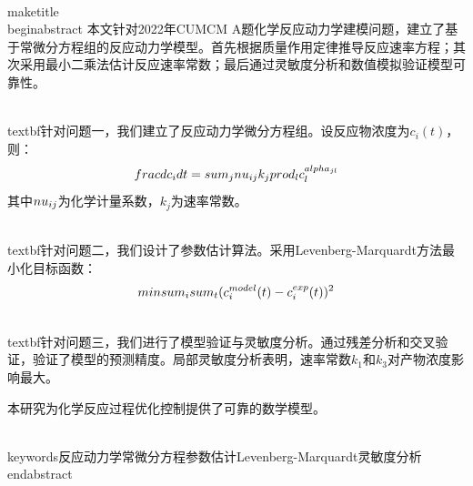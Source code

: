 \\maketitle
\\begin{abstract}
    本文针对2022年CUMCM A题化学反应动力学建模问题，建立了基于常微分方程组的反应动力学模型。首先根据质量作用定律推导反应速率方程；其次采用最小二乘法估计反应速率常数；最后通过灵敏度分析和数值模拟验证模型可靠性。
    
    \\textbf{针对问题一}，我们建立了反应动力学微分方程组。设反应物浓度为$c_i(t)$，则：
    $$\\frac{dc_i}{dt} = \\sum_j \\nu_{ij} k_j \\prod_l c_l^{\\alpha_{jl}}$$
    其中$\\nu_{ij}$为化学计量系数，$k_j$为速率常数。
    
    \\textbf{针对问题二}，我们设计了参数估计算法。采用Levenberg-Marquardt方法最小化目标函数：
    $$\\min \\sum_i \\sum_t (c_i^{model}(t) - c_i^{exp}(t))^2$$
    
    \\textbf{针对问题三}，我们进行了模型验证与灵敏度分析。通过残差分析和交叉验证，验证了模型的预测精度。局部灵敏度分析表明，速率常数$k_1$和$k_3$对产物浓度影响最大。
    
    本研究为化学反应过程优化控制提供了可靠的数学模型。
    
    \\keywords{反应动力学\quad 常微分方程\quad 参数估计\quad Levenberg-Marquardt\quad 灵敏度分析}
\\end{abstract}
